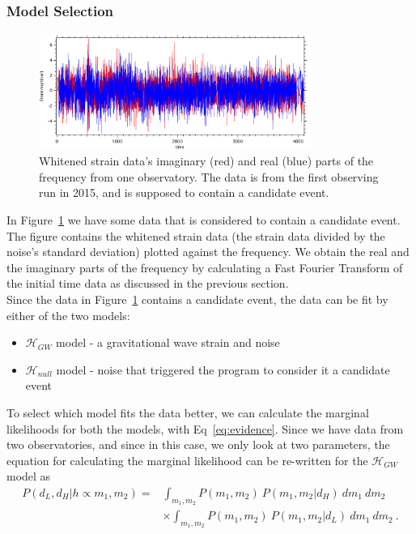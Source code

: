 \documentclass{article}
\makeatletter
\newcommand\mynobreakpar{\par\nobreak\@afterheading}
\makeatother
\begin{document}
 \subsubsection{Model Selection}

   \begin{figure}[h]
   	\centering
   	\includegraphics[width=0.8\textwidth]{Figures/strainData.pdf}
   	\caption{Whitened strain data's imaginary (red) and real (blue) parts of the frequency from one observatory. The data is from the first observing run in 2015, and is supposed to contain a candidate event.}
   	\label{Fig:strainData}
   \end{figure}
   
 
 In Figure~\ref{Fig:strainData} we have some data that is considered to contain a candidate event. The figure contains the whitened strain data (the strain data divided by the noise's standard deviation) plotted against the frequency. We obtain the real and the imaginary parts of the frequency by calculating a Fast Fourier Transform of the initial time data as discussed in the previous section.\\
 
 Since the data in Figure~\ref{Fig:strainData} contains a candidate event, the data can be fit by either of the two models:  \mynobreakpar
 \begin{itemize}
 	\item $\mathcal{H}_{GW}$ model - a gravitational wave strain and noise \mynobreakpar
 	\item $\mathcal{H}_{null}$ model - noise that triggered the program to consider it a candidate event
 \end{itemize}
 
 To select which model fits the data better, we can calculate the marginal likelihoods for both the models, with Eq~\ref{eq:evidence}. Since we have data from two observatories, and since in this case, we only look at two parameters, the equation for calculating the marginal likelihood can be re-written for the $\mathcal{H}_{GW}$ model as 
 \begin{align*}
 	P(d_L,d_H | h\propto m_1, m_2) = & \int_{m_1, m_2} { P(m_1,m_2) \ P(m_1,m_2 | d_H)\ dm_1\ dm_2 } \\
 	& \times \int_{m_1, m_2} { P(m_1,m_2) \ P(m_1,m_2 | d_L)\ dm_1\ dm_2 } \ .
 \end{align*}
 
\end{document}
